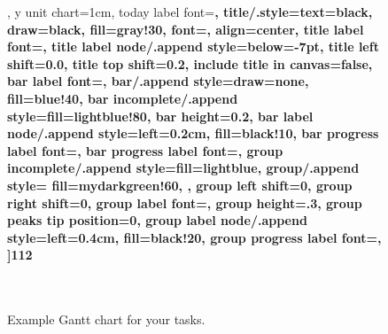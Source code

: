\begin{itemize}
\begin{figure}[h]
\begin{center}
\begin{ganttchart}
{				},
				y unit chart=1cm,
				today label font=\footnotesize\bfseries,
				title/.style={text=black, draw=black, fill=gray!30, font=\Large\bfseries, align=center},
				title label font=\bfseries\footnotesize,
				title label node/.append style={below=-7pt},
				title left shift=0.0,
				title top shift=0.2,
				include title in canvas=false,
				bar label font=\mdseries\small\color{black!90},
				bar/.append style={draw=none, fill=blue!40},
				bar incomplete/.append style={fill=lightblue!80},
				bar height=0.2,
				bar label node/.append style={left=0.2cm, fill=black!10},
				bar progress label font=\bfseries\small,
				bar progress label font=\mdseries\footnotesize\color{black!80},
				group incomplete/.append style={fill=lightblue},
				group/.append style={
					fill=mydarkgreen!60, %
				},
				group left shift=0,
				group right shift=0,
				group label font=\mdseries\bfseries\small\color{black!90},
				group height=.3,
				group peaks tip position=0,
				group label node/.append style={left=0.4cm, fill=black!20},
				group progress label font=\mdseries\footnotesize\color{black!80},
				]{1}{12}
				 \\
				[grid]
				 \\
				[grid]
				 \\
				[grid]
			\end{ganttchart}
		\end{center}
		\caption{Example Gantt chart for your tasks.}
	\end{figure}
	
\end{itemize}
